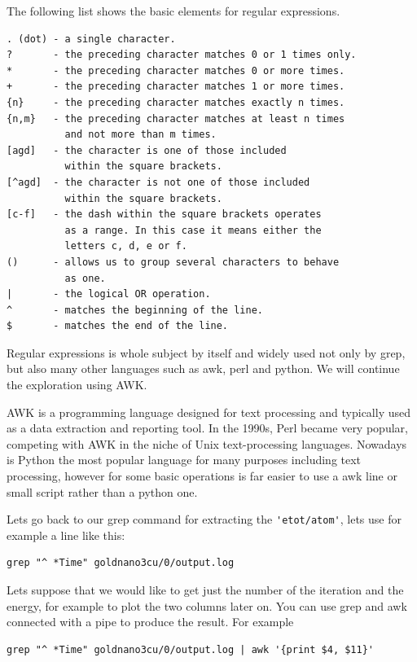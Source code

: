 The following list shows the basic elements for regular expressions.

\begin{lstlisting}
. (dot) - a single character.
?       - the preceding character matches 0 or 1 times only.
*       - the preceding character matches 0 or more times.
+       - the preceding character matches 1 or more times.
{n}     - the preceding character matches exactly n times.
{n,m}   - the preceding character matches at least n times        
          and not more than m times.
[agd]   - the character is one of those included 
          within the square brackets.
[^agd]  - the character is not one of those included 
          within the square brackets.
[c-f]   - the dash within the square brackets operates 
          as a range. In this case it means either the 
          letters c, d, e or f.
()      - allows us to group several characters to behave 
          as one.
|       - the logical OR operation.
^       - matches the beginning of the line.
$       - matches the end of the line.
\end{lstlisting}

Regular expressions is whole subject by itself and widely used not only by grep, but also many other languages such as awk, perl and python. We will continue the exploration using AWK.

AWK is a programming language designed for text processing and typically used as a data extraction and reporting tool.
In the 1990s, Perl became very popular, competing with AWK in the niche of Unix text-processing languages. Nowadays is Python the most popular language for many purposes including text processing, however for some basic operations is far easier to use a awk line or small script rather than a python one.

Lets go back to our grep command for extracting the \verb|'etot/atom'|, lets use for example a line like this:

\begin{lstlisting}
grep "^ *Time" goldnano3cu/0/output.log
\end{lstlisting}

Lets suppose that we would like to get just the number of the iteration and the energy, for example to plot the two columns later on. You can use grep and awk connected with a pipe to produce the result. For example

\begin{lstlisting}
grep "^ *Time" goldnano3cu/0/output.log | awk '{print $4, $11}'
\end{lstlisting}

